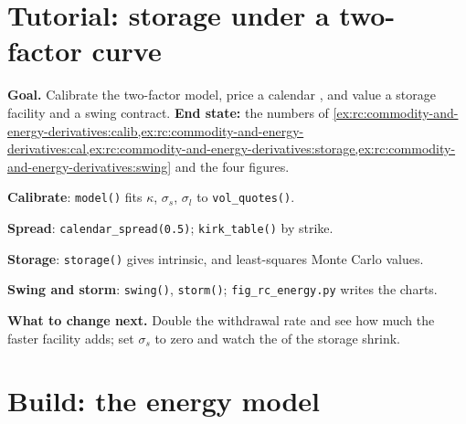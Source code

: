 \section{Tutorial: storage under a two-factor curve}\label{tut:rc:commodity-and-energy-derivatives:tutorial}

\begin{tutorial}
\textbf{Goal.} Calibrate the two-factor model, price a calendar , and value a
storage facility and a swing contract. \textbf{End state:} the numbers of
\cref{ex:rc:commodity-and-energy-derivatives:calib,ex:rc:commodity-and-energy-derivatives:cal,ex:rc:commodity-and-energy-derivatives:storage,ex:rc:commodity-and-energy-derivatives:swing}
and the four figures.
\begin{tutsteps}
\item \textbf{Calibrate}: \texttt{model()} fits $\kappa$, $\sigma_s$, $\sigma_l$ to
\texttt{vol\_quotes()}.
\item \textbf{Spread}: \texttt{calendar\_spread(0.5)}; \texttt{kirk\_table()} by strike.
\item \textbf{Storage}: \texttt{storage()} gives intrinsic,  and
least-squares Monte Carlo values.
\item \textbf{Swing and storm}: \texttt{swing()}, \texttt{storm()};
\texttt{fig\_rc\_energy.py} writes the charts.
\end{tutsteps}
\textbf{What to change next.} Double the withdrawal rate and see how much 
the faster facility adds; set $\sigma_s$ to zero and watch the  of the
storage shrink.
\end{tutorial}

\section{Build: the energy model}\label{bld:rc:commodity-and-energy-derivatives:energymodel}

